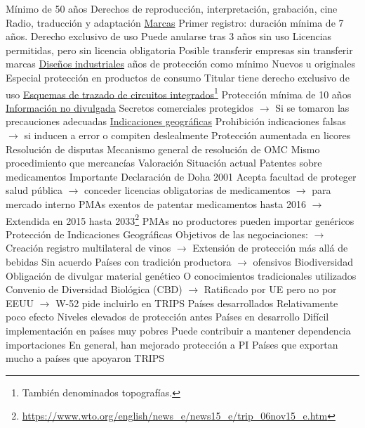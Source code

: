 \documentclass{nuevotema}
\begin{document}
\begin{esquemal}
				\4[] Mínimo de 50 años
				\4[] Derechos de reproducción, interpretación, grabación, cine
				\4[] Radio, traducción y adaptación
				\4 \underline{Marcas}
				\4[] Primer registro: duración mínima de 7 años.
				\4[] Derecho exclusivo de uso
				\4[] Puede anularse tras 3 años sin uso
				\4[] Licencias permitidas, pero sin licencia obligatoria
				\4[] Posible transferir empresas sin transferir marcas
				\4 \underline{Diseños industriales}
				 años de protección como mínimo
				\4[] Nuevos u originales
				\4[] Especial protección en productos de consumo
				\4[] Titular tiene derecho exclusivo de uso
				\4 \underline{Esquemas de trazado de circuitos integrados}\footnote{También denominados topografías.}
				\4[] Protección mínima de 10 años
				\4 \underline{Información no divulgada}
				\4[] Secretos comerciales protegidos
				\4[] $\to$ Si se tomaron las precauciones adecuadas
				\4 \underline{Indicaciones geográficas}
				\4[] Prohibición indicaciones falsas
				\4[] $\to$ si inducen a error o compiten deslealmente
				\4[] Protección aumentada en licores
			\3 Resolución de disputas
				\4 Mecanismo general de resolución de OMC
				\4 Mismo procedimiento que mercancías
		\2 Valoración
			\3 Situación actual
				\4 Patentes sobre medicamentos
				\4[] Importante Declaración de Doha 2001
				\4[] Acepta facultad de proteger salud pública
				\4[] $\to$ conceder licencias obligatorias de medicamentos
				\4[] $\to$ para mercado interno
				\4[] PMAs exentos de patentar medicamentos hasta 2016
				\4[] $\to$ Extendida en 2015 hasta 2033\footnote{\url{https://www.wto.org/english/news_e/news15_e/trip_06nov15_e.htm}}
				\4[] PMAs no productores pueden importar genéricos
				\4 Protección de Indicaciones Geográficas
				\4[] Objetivos de las negociaciones:
				\4[] $\to$ Creación registro multilateral de vinos
				\4[] $\to$ Extensión de protección más allá de bebidas
				\4[] Sin acuerdo
				\4[] Países con tradición productora $\to$ ofensivos
				\4 Biodiversidad
				\4[] Obligación de divulgar material genético
				\4[] O conocimientos tradicionales utilizados
				\4[] Convenio de Diversidad Biológica (CBD)
				\4[] $\to$ Ratificado por UE pero no por EEUU
				\4[] $\to$ W-52 pide incluirlo en TRIPS
			\3 Países desarrollados
				\4 Relativamente poco efecto
				\4[$\to$] Niveles elevados de protección antes
			\3 Países en desarrollo
				\4 Difícil implementación en países muy pobres
				\4 Puede contribuir a mantener dependencia importaciones
				\4 En general, han mejorado protección a PI
				\4 Países que exportan mucho a países que apoyaron TRIPS

\end{esquemal}
\end{document}

